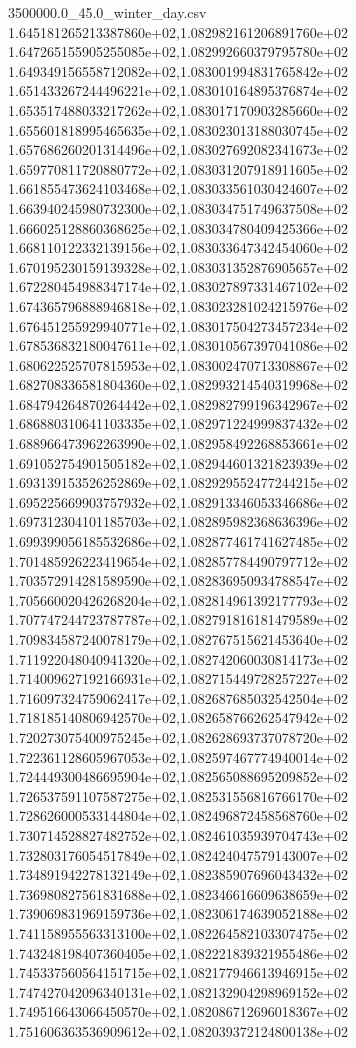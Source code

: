 \begin{filecontents*}{3500000.0_45.0_winter_day.csv}
1.645181265213387860e+02,1.082982161206891760e+02
1.647265155905255085e+02,1.082992660379795780e+02
1.649349156558712082e+02,1.083001994831765842e+02
1.651433267244496221e+02,1.083010164895376874e+02
1.653517488033217262e+02,1.083017170903285660e+02
1.655601818995465635e+02,1.083023013188030745e+02
1.657686260201314496e+02,1.083027692082341673e+02
1.659770811720880772e+02,1.083031207918911605e+02
1.661855473624103468e+02,1.083033561030424607e+02
1.663940245980732300e+02,1.083034751749637508e+02
1.666025128860368625e+02,1.083034780409425366e+02
1.668110122332139156e+02,1.083033647342454060e+02
1.670195230159139328e+02,1.083031352876905657e+02
1.672280454988347174e+02,1.083027897331467102e+02
1.674365796888946818e+02,1.083023281024215976e+02
1.676451255929940771e+02,1.083017504273457234e+02
1.678536832180047611e+02,1.083010567397041086e+02
1.680622525707815953e+02,1.083002470713308867e+02
1.682708336581804360e+02,1.082993214540319968e+02
1.684794264870264442e+02,1.082982799196342967e+02
1.686880310641103335e+02,1.082971224999837432e+02
1.688966473962263990e+02,1.082958492268853661e+02
1.691052754901505182e+02,1.082944601321823939e+02
1.693139153526252869e+02,1.082929552477244215e+02
1.695225669903757932e+02,1.082913346053346686e+02
1.697312304101185703e+02,1.082895982368636396e+02
1.699399056185532686e+02,1.082877461741627485e+02
1.701485926223419654e+02,1.082857784490797712e+02
1.703572914281589590e+02,1.082836950934788547e+02
1.705660020426268204e+02,1.082814961392177793e+02
1.707747244723787787e+02,1.082791816181479589e+02
1.709834587240078179e+02,1.082767515621453640e+02
1.711922048040941320e+02,1.082742060030814173e+02
1.714009627192166931e+02,1.082715449728257227e+02
1.716097324759062417e+02,1.082687685032542504e+02
1.718185140806942570e+02,1.082658766262547942e+02
1.720273075400975245e+02,1.082628693737078720e+02
1.722361128605967053e+02,1.082597467774940014e+02
1.724449300486695904e+02,1.082565088695209852e+02
1.726537591107587275e+02,1.082531556816766170e+02
1.728626000533144804e+02,1.082496872458568760e+02
1.730714528827482752e+02,1.082461035939704743e+02
1.732803176054517849e+02,1.082424047579143007e+02
1.734891942278132149e+02,1.082385907696043432e+02
1.736980827561831688e+02,1.082346616609638659e+02
1.739069831969159736e+02,1.082306174639052188e+02
1.741158955563313100e+02,1.082264582103307475e+02
1.743248198407360405e+02,1.082221839321955486e+02
1.745337560564151715e+02,1.082177946613946915e+02
1.747427042096340131e+02,1.082132904298969152e+02
1.749516643066450570e+02,1.082086712696018367e+02
1.751606363536909612e+02,1.082039372124800138e+02

\end{filecontents*}

